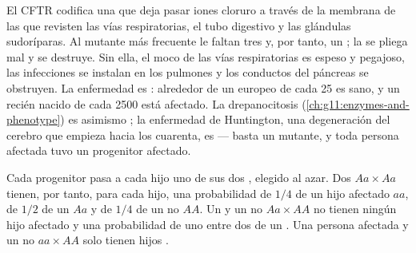 \begin{example}\label{ex:g11:genes-and-disease:cf}
El  CFTR codifica una  que deja pasar iones cloruro a través
de la membrana de las  que revisten las vías respiratorias, el
tubo digestivo y las glándulas sudoríparas. Al  mutante más
frecuente le faltan tres  y, por tanto, un ; la
 se pliega mal y se destruye. Sin ella, el moco de las vías
respiratorias es espeso y pegajoso, las infecciones se instalan en los
pulmones y los conductos del páncreas se obstruyen. La enfermedad es
: alrededor de un europeo de cada 25 es  sano, y un
recién nacido de cada 2500 está afectado. La drepanocitosis
(\cref{ch:g11:enzymes-and-phenotype}) es asimismo ; la
enfermedad de Huntington, una degeneración del cerebro que empieza
hacia los cuarenta, es  --- basta un  mutante, y toda
persona afectada tuvo un progenitor afectado.
\end{example}

\begin{proposition}\label{prop:g11:genes-and-disease:recessive}
Cada progenitor pasa a cada hijo uno de sus dos , elegido al
azar. Dos  $Aa \times Aa$ tienen, por tanto, para cada hijo,
una probabilidad de $1/4$ de un hijo afectado $aa$, de $1/2$ de un
 $Aa$ y de $1/4$ de un no  $AA$. Un  y un no
 $Aa \times AA$ no tienen ningún hijo afectado y una
probabilidad de uno entre dos de un . Una persona afectada y un
no  $aa \times AA$ solo tienen hijos .
\end{proposition}
\admitted

